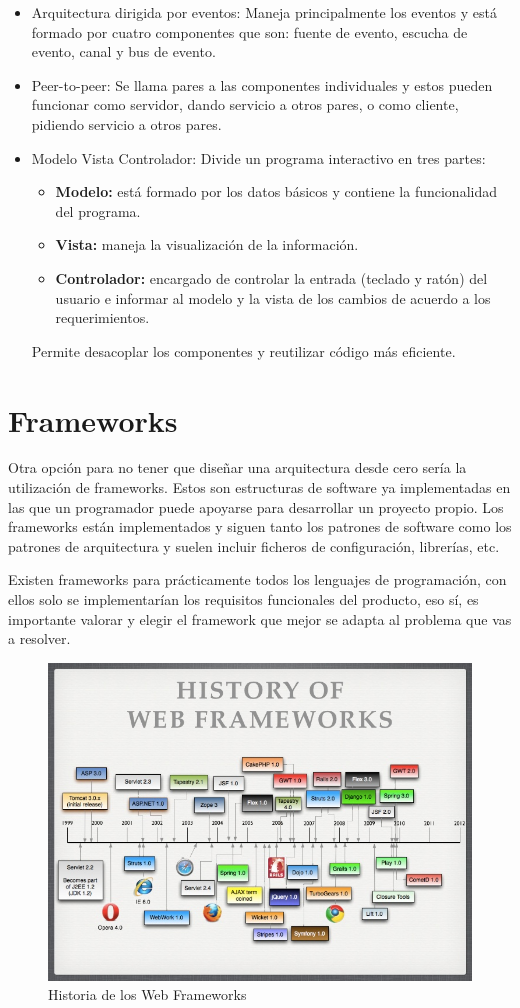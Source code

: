 \documentclass[12pt]{report} %
\begin{document}
\begin{itemize}
\begin{itemize}
 	\end{itemize}
 	\item Arquitectura dirigida por eventos: Maneja principalmente los eventos y está formado por cuatro componentes que son: fuente de evento, escucha de evento, canal y bus de evento.
 	\item Peer-to-peer: Se llama pares a las componentes individuales y estos pueden funcionar como servidor, dando servicio a otros pares, o como cliente, pidiendo servicio a otros pares.
 	\item Modelo Vista Controlador: Divide un programa interactivo en tres partes:
 		\begin{itemize}
 			\item \textbf{Modelo:} está formado por los datos básicos y contiene la funcionalidad del programa. 
 			\item \textbf{Vista:} maneja la visualización de la información. 
 			\item \textbf{Controlador:} encargado de controlar la entrada (teclado y ratón) del usuario e informar al modelo y la vista de los cambios de acuerdo a los requerimientos.
 		\end{itemize}
 	Permite desacoplar los componentes y reutilizar código más eficiente. 
 \end{itemize}

\section{Frameworks}
 Otra opción para no tener que diseñar una arquitectura desde cero sería la utilización de frameworks. Estos son estructuras de software ya implementadas en las que un programador puede apoyarse para desarrollar un proyecto propio. Los frameworks están implementados y siguen tanto los patrones de software como los patrones de arquitectura y suelen incluir ficheros de configuración, librerías, etc.
 
 Existen frameworks para prácticamente todos los lenguajes de programación, con ellos solo se implementarían los requisitos funcionales del producto, eso sí, es importante valorar y elegir el framework que mejor se adapta al problema que vas a resolver.
 
  \begin{figure}
 	\centering
 	\includegraphics[width=0.7\linewidth]{imagenes/the-future-of-web-frameworks-11-728}
 	\caption{Historia de los Web Frameworks}
 	\label{fig:webFrameworks}
 \end{figure}
\end{document}
